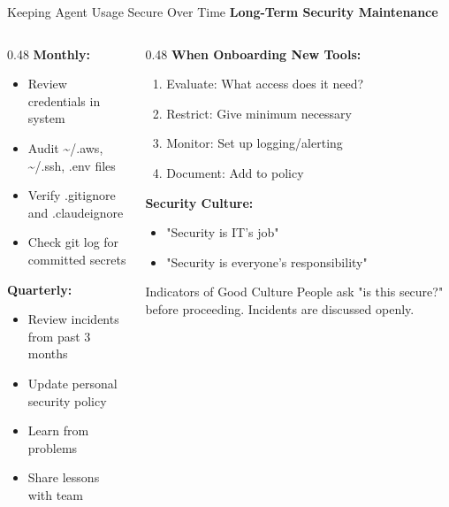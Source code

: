 \documentclass[aspectratio=169,11pt]{beamer}
\begin{document}
\begin{frame}{Keeping Agent Usage Secure Over Time}
    \textbf{Long-Term Security Maintenance}

    \begin{columns}[T]
        \begin{column}{0.48\textwidth}
            \textbf{Monthly:}
            \begin{itemize}
                \item Review credentials in system
                \item Audit \~{}/.aws, \~{}/.ssh, .env files
                \item Verify .gitignore and .claudeignore
                \item Check git log for committed secrets
            \end{itemize}

            \vspace{0.3cm}
            \textbf{Quarterly:}
            \begin{itemize}
                \item Review incidents from past 3 months
                \item Update personal security policy
                \item Learn from problems
                \item Share lessons with team
            \end{itemize}
        \end{column}
        \begin{column}{0.48\textwidth}
            \textbf{When Onboarding New Tools:}
            \begin{enumerate}
                \item Evaluate: What access does it need?
                \item Restrict: Give minimum necessary
                \item Monitor: Set up logging/alerting
                \item Document: Add to policy
            \end{enumerate}

            \vspace{0.3cm}
            \textbf{Security Culture:}
            \begin{itemize}
                \item[\textcolor{UofSCRose}{\texttimes}] "Security is IT's job"
                \item[\textcolor{UofSCHorseshoe}{\checkmark}] "Security is everyone's responsibility"
            \end{itemize}

            \begin{block}{Indicators of Good Culture}
                People ask "is this secure?" before proceeding. Incidents are discussed openly.
            \end{block}
        \end{column}
    \end{columns}
\end{frame}
\end{document}

